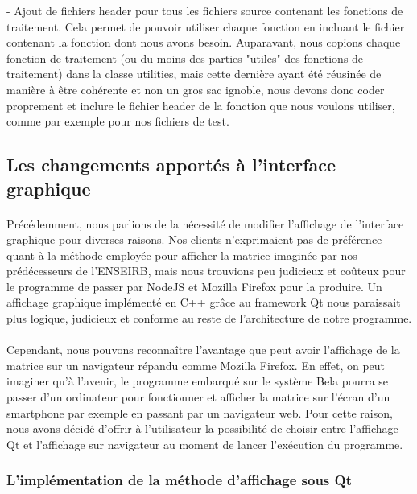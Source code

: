   - Ajout de fichiers header pour tous les fichiers source contenant les
  fonctions de traitement. Cela permet de pouvoir utiliser chaque fonction en
  incluant le fichier contenant la fonction dont nous avons besoin. Auparavant,
  nous copions chaque fonction de traitement (ou du moins des parties "utiles"
  des fonctions de traitement) dans la classe utilities, mais cette dernière
  ayant été réusinée de manière à être cohérente et non un gros sac ignoble,
  nous devons donc coder proprement et inclure le fichier header de la fonction
  que nous voulons utiliser, comme par exemple pour nos fichiers de test.

\subsection{Les changements apportés à l'interface graphique}
\paragraph{}
Précédemment, nous parlions de la nécessité de modifier l'affichage de
l'interface graphique pour diverses raisons. Nos clients n'exprimaient
pas de préférence quant à la méthode employée pour afficher la matrice
imaginée par nos prédécesseurs de l'ENSEIRB, mais nous trouvions peu
judicieux et coûteux pour le programme de passer par NodeJS et Mozilla
Firefox pour la produire. Un affichage graphique implémenté en C++
grâce au framework Qt nous paraissait plus logique, judicieux et
conforme au reste de l'architecture de notre programme.
\paragraph{}
Cependant, nous pouvons reconnaître l'avantage que peut avoir
l'affichage de la matrice sur un navigateur répandu comme Mozilla
Firefox. En effet, on peut imaginer qu'à l'avenir, le programme
embarqué sur le système Bela pourra se passer d'un ordinateur pour
fonctionner et afficher la matrice sur l'écran d'un smartphone par
exemple en passant par un navigateur web. Pour cette raison, nous
avons décidé d'offrir à l'utilisateur la possibilité de choisir entre
l'affichage Qt et l'affichage sur navigateur au moment de lancer
l'exécution du programme.

\subsubsection{L'implémentation de la méthode d'affichage sous Qt}
